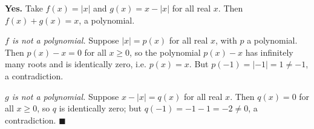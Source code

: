 \textbf{Yes.} Take $f(x)=|x|$ and $g(x)=x-|x|$ for all real $x$. Then $f(x)+g(x)=x$, a polynomial.

\emph{$f$ is not a polynomial.} Suppose $|x|=p(x)$ for all real $x$, with $p$ a polynomial. Then $p(x)-x=0$ for all $x\ge0$, so the polynomial $p(x)-x$ has infinitely many roots and is identically zero, i.e. $p(x)=x$. But $p(-1)=|-1|=1\ne-1$, a contradiction.

\emph{$g$ is not a polynomial.} Suppose $x-|x|=q(x)$ for all real $x$. Then $q(x)=0$ for all $x\ge0$, so $q$ is identically zero; but $q(-1)=-1-1=-2\ne0$, a contradiction. $\blacksquare$

